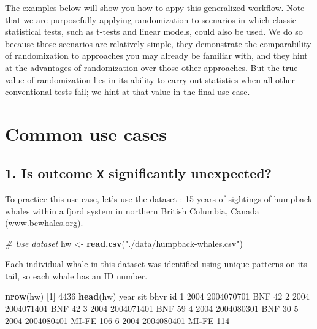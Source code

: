 \documentclass[
]{book}
\newenvironment{Shaded}{\begin{snugshade}}{\end{snugshade}}
\newcommand{\CommentTok}[1]{\textcolor[rgb]{0.56,0.35,0.01}{\textit{#1}}}
\newcommand{\DecValTok}[1]{\textcolor[rgb]{0.00,0.00,0.81}{#1}}
\newcommand{\KeywordTok}[1]{\textcolor[rgb]{0.13,0.29,0.53}{\textbf{#1}}}
\newcommand{\NormalTok}[1]{#1}
\newcommand{\OperatorTok}[1]{\textcolor[rgb]{0.81,0.36,0.00}{\textbf{#1}}}
\newcommand{\StringTok}[1]{\textcolor[rgb]{0.31,0.60,0.02}{#1}}
\begin{document}
The examples below will show you how to appy this generalized workflow. Note that we are purposefully applying randomization to scenarios in which classic statistical tests, such as t-tests and linear models, could also be used. We do so because those scenarios are relatively simple, they demonstrate the comparability of randomization to approaches you may already be familiar with, and they hint at the advantages of randomization over those other approaches. But the true value of randomization lies in its ability to carry out statistics when all other conventional tests fail; we hint at that value in the final use case.

\hypertarget{common-use-cases}{%
\section*{Common use cases}\label{common-use-cases}}

\hypertarget{is-outcome-x-significantly-unexpected}{%
\subsection*{\texorpdfstring{1. Is outcome \texttt{X} significantly unexpected?}{1. Is outcome X significantly unexpected?}}\label{is-outcome-x-significantly-unexpected}}

To practice this use case, let's use the dataset : 15 years of sightings of humpback whales within a fjord system in northern British Columbia, Canada (\url{www.bcwhales.org}).

\begin{Shaded}
\begin{Highlighting}[]
\CommentTok{# Use dataset}
\NormalTok{hw <-}\StringTok{ }\KeywordTok{read.csv}\NormalTok{(}\StringTok{"./data/humpback-whales.csv"}\NormalTok{)}
\end{Highlighting}
\end{Shaded}

Each individual whale in this dataset was identified using unique patterns on its tail, so each whale has an ID number.

\begin{Shaded}
\begin{Highlighting}[]
\KeywordTok{nrow}\NormalTok{(hw)}
\NormalTok{[}\DecValTok{1}\NormalTok{] }\DecValTok{4436}
\KeywordTok{head}\NormalTok{(hw)}
\NormalTok{  year        sit  bhvr  id}
\DecValTok{1} \DecValTok{2004} \DecValTok{2004070701}\NormalTok{   BNF  }\DecValTok{42}
\DecValTok{2} \DecValTok{2004} \DecValTok{2004071401}\NormalTok{   BNF  }\DecValTok{42}
\DecValTok{3} \DecValTok{2004} \DecValTok{2004071401}\NormalTok{   BNF  }\DecValTok{59}
\DecValTok{4} \DecValTok{2004} \DecValTok{2004080301}\NormalTok{   BNF  }\DecValTok{30}
\DecValTok{5} \DecValTok{2004} \DecValTok{2004080401}\NormalTok{ MI}\OperatorTok{-}\NormalTok{FE }\DecValTok{106}
\DecValTok{6} \DecValTok{2004} \DecValTok{2004080401}\NormalTok{ MI}\OperatorTok{-}\NormalTok{FE }\DecValTok{114}
\end{Highlighting}
\end{Shaded}
\end{document}
